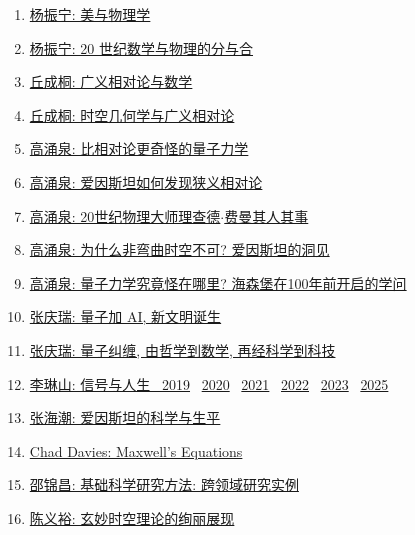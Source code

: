 \documentclass[11pt]{article}
\begin{document}
\begin{enumerate}
	\item \href{https://mp.weixin.qq.com/s/FX69F9XDy5wjcJ60kUJM6g}{杨振宁: 美与物理学}	%
	\item \href{https://mp.weixin.qq.com/s/uVdW4G3vbp0NHbuQ-F3Csg}{杨振宁: 20 世纪数学与物理的分与合}	%
	\item \href{https://mp.weixin.qq.com/s/nFFqyTDZg3VYadGgvXKNNA}{丘成桐: 广义相对论与数学}	%
	\item \href{https://mp.weixin.qq.com/s/4xGp2PjOZaxsXFPSJ9-iEQ}{丘成桐: 时空几何学与广义相对论}	%
	\item \href{https://mp.weixin.qq.com/s/ETtGyYwkDtkQwZns4NMEzw}{高涌泉: 比相对论更奇怪的量子力学}	%
	\item \href{https://mp.weixin.qq.com/s/2O0377rTEINq5jMCnm_PNw}{高涌泉: 爱因斯坦如何发现狭义相对论}	%
	\item \href{https://mp.weixin.qq.com/s/ZksWAeyMlvl5G52R8HNXaA}{高涌泉: 20世纪物理大师理查德$\cdot$费曼其人其事}	%
	\item \href{https://mp.weixin.qq.com/s/4nFEYIH51VraTI30JjQrhg}{高涌泉: 为什么非弯曲时空不可? 爱因斯坦的洞见}	%
	\item \href{https://mp.weixin.qq.com/s/vYmzBTTf125aUoO8d4zGKA}{高涌泉: 量子力学究竟怪在哪里? 海森堡在100年前开启的学问}	%
	\item \href{https://mp.weixin.qq.com/s/RGlpCiKHJDw_mLl1JJ0ZgA}{张庆瑞: 量子加 AI, 新文明诞生}	%
	\item \href{https://mp.weixin.qq.com/s/tztr4DGH0Hz8Qw-4tjZNow}{张庆瑞: 量子纠缠, 由哲学到数学, 再经科学到科技}	%
	\item \href{https://mp.weixin.qq.com/s/3d-oc_lm16PMrbBz3QmmIQ}{李琳山: 信号与人生 \ 2019} \ \href{https://mp.weixin.qq.com/s/SLUu1_TCzA-sXBzC2yDEyg} {2020} \ \href{https://mp.weixin.qq.com/s/BOJTWfjGwDC3dooUfjID2Q} {2021} \ \href{https://mp.weixin.qq.com/s/dWaUrMWxM07CrtWRqybVtw} {2022} \ \href{https://mp.weixin.qq.com/s/AAOhjeo14wVO_SArapx4ZQ} {2023} \ \href{https://mp.weixin.qq.com/s/X0FBXD0eVfudm9zHQap_iA} {2025} %
	\item \href{https://mp.weixin.qq.com/s/3XLe4oFvgRdtNwqIxLGSaA}{张海潮: 爱因斯坦的科学与生平}	%
	\item \href{https://mp.weixin.qq.com/s/TL5VBcxckh3zxFAOGSMfzw}{Chad Davies: Maxwell's Equations}	%
	\item \href{https://mp.weixin.qq.com/s/mn_XEd9a3maHXnJJDc2--Q}{邵锦昌: 基础科学研究方法: 跨领域研究实例}	%
	\item \href{https://mp.weixin.qq.com/s/YAAfDzpLc69hiOKjX0vVVQ}{陈义裕: 玄妙时空理论的绚丽展现}	%

\end{enumerate}
\end{document}
